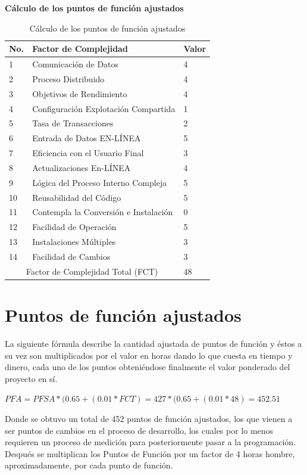 \documentclass[a4paper,12pt,openany,oneside]{book}
\begin{document}
\begin{table}
\textbf{Cálculo de los puntos de función ajustados}\\
\begin{tabular}{| l | l | l |}
\hline
\textbf{No.} & \textbf{Factor de Complejidad} & \textbf{Valor}\\
\hline
1 &  Comunicación de Datos & 4 \\
\hline
2 &  Proceso Distribuido &4  \\
\hline
3 & Objetivos de Rendimiento  &4  \\
\hline
4 & Configuración Explotación Compartida  & 1 \\
\hline
5 & Tasa de Transacciones  & 2 \\
\hline
6 &  Entrada de Datos EN-LÍNEA &  5\\
\hline
7 & Eficiencia con el Usuario Final  &  3\\
\hline
8 & Actualizaciones En-LÍNEA  & 4 \\
\hline
9 & Lógica del Proceso Interno Compleja  &  5\\
\hline
10 & Reusabilidad del Código  &  5\\
\hline
11&  Contempla la Conversión e Instalación &  0\\
\hline
12& Facilidad de Operación  &  5\\
\hline
13& Instalaciones Múltiples  &  3\\
\hline
14& Facilidad de Cambios  & 3 \\
\hline
\multicolumn{2}{|c|}{Factor de Complejidad Total (FCT)} & 48\\
\hline
\end{tabular}
\caption{Cálculo de los puntos de función ajustados}
\end{table}

\section{Puntos de función ajustados}
La siguiente fórmula describe la cantidad ajustada de puntos de función y éstos a su vez son multiplicados por el valor en horas dando lo que cuesta en tiempo y dinero, cada uno de los puntos obteniéndose finalmente el valor ponderado del proyecto en sí.

\begin{math}
PFA=PFSA * ( 0.65 + ( 0.01 * FCT ) = 427 * ( 0.65 + ( 0.01 * 48 ) = 452.51
\end{math}

Donde se obtuvo un total de 452 puntos de función ajustados, los que vienen a ser puntos de cambios en el proceso de desarrollo, los cuales por lo menos requieren un proceso de medición para posteriormente pasar a la programación. Después se multiplican los Puntos de Función por un factor de 4 horas hombre, aproximadamente, por cada punto de función.
\end{document}
